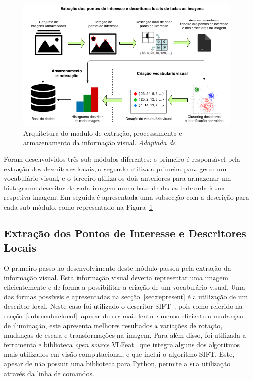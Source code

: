\begin{figure}[h]
\centering
\includegraphics[width=0.95\linewidth]{./figures/infovisual}
\caption{Arquitetura do módulo de extração, processamento e armazenamento da informação visual. \textit{Adaptada de}~\cite{Bueno2011}}
\label{fig:infovisual}
\end{figure}

Foram desenvolvidos três sub-módulos diferentes: o primeiro é responsável pela extração dos descritores locais, o segundo utiliza o primeiro para gerar um vocabulário visual, e o terceiro utiliza os dois anteriores para armazenar um histograma descritor de cada imagem numa base de dados indexada à sua respetiva imagem. 
Em seguida é apresentada uma subsecção com a descrição para cada sub-módulo, como representado na Figura~\ref{fig:infovisual}

\subsection{Extração dos Pontos de Interesse e Descritores Locais}

O primeiro passo no desenvolvimento deste módulo passou pela extração da informação visual. Esta informação visual deveria representar uma imagem eficientemente e de forma a possibilitar a criação de um vocabulário visual. Uma das formas possíveis e apresentadas na secção~\ref{sec:represent} é a utilização de um descritor local. Neste caso foi utilizado o descritor SIFT~\cite{Lowe1999, Lowe2004}, pois como referido na secção~\ref{subsec:desclocal}, apesar de ser mais lento e menos eficiente a mudanças de iluminação, este apresenta melhores resultados a variações de rotação, mudanças de escala e transformações na imagem. Para além disso, foi utilizada a ferramenta e biblioteca \textit{open source} VLFeat~\cite{vedaldi08vlfeat} que integra alguns dos algoritmos mais utilizados em visão computacional, e que inclui o algoritmo SIFT. Este, apesar de não possuir uma biblioteca para Python, permite a sua utilização através da linha de comandos.

